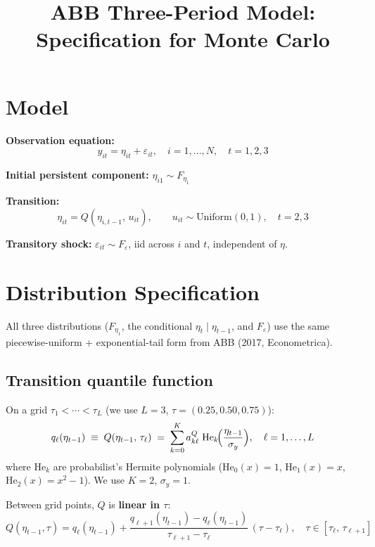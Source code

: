 \documentclass[12pt]{article}
\title{ABB Three-Period Model: Specification for Monte Carlo}
\author{}
\date{}
\begin{document}
\maketitle

\section{Model}

\textbf{Observation equation:}
\begin{equation}
y_{it} = \eta_{it} + \varepsilon_{it}, \quad i = 1,\ldots,N, \quad t = 1, 2, 3
\end{equation}

\textbf{Initial persistent component:} $\eta_{i1} \sim F_{\eta_1}$

\textbf{Transition:}
\begin{equation}
\eta_{it} = Q(\eta_{i,t-1},\, u_{it}), \qquad u_{it} \sim \mathrm{Uniform}(0,1), \quad t = 2, 3
\end{equation}

\textbf{Transitory shock:} $\varepsilon_{it} \sim F_\varepsilon$, iid across $i$ and $t$, independent of $\eta$.

\section{Distribution Specification}

All three distributions ($F_{\eta_1}$, the conditional $\eta_t \mid \eta_{t-1}$, and $F_\varepsilon$) use the same piecewise-uniform + exponential-tail form from ABB (2017, Econometrica).

\subsection{Transition quantile function}

On a grid $\tau_1 < \cdots < \tau_L$ (we use $L=3$, $\tau = (0.25, 0.50, 0.75)$):
\begin{equation}
q_\ell(\eta_{t-1}) \;\equiv\; Q(\eta_{t-1},\, \tau_\ell) \;=\; \sum_{k=0}^{K} a_{k\ell}^Q \;\mathrm{He}_k\!\Bigl(\frac{\eta_{t-1}}{\sigma_y}\Bigr), \quad \ell = 1,\ldots,L
\end{equation}
where $\mathrm{He}_k$ are probabilist's Hermite polynomials ($\mathrm{He}_0(x)=1$, $\mathrm{He}_1(x)=x$, $\mathrm{He}_2(x)=x^2-1$). We use $K=2$, $\sigma_y = 1$.

Between grid points, $Q$ is \textbf{linear in $\tau$}:
\begin{equation}
Q(\eta_{t-1}, \tau) = q_\ell(\eta_{t-1}) + \frac{q_{\ell+1}(\eta_{t-1}) - q_\ell(\eta_{t-1})}{\tau_{\ell+1} - \tau_\ell}\,(\tau - \tau_\ell), \quad \tau \in [\tau_\ell,\, \tau_{\ell+1}]
\end{equation}
\end{document}
